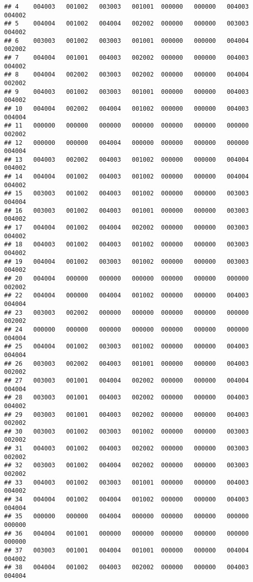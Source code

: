 \documentclass[
]{article}
\begin{document}
\begin{verbatim}
## 4    004003   001002   003003   001001  000000   000000   004003   004002
## 5    004004   001002   004004   002002  000000   000000   003003   004002
## 6    003003   001002   003003   001001  000000   000000   004004   002002
## 7    004004   001001   004003   002002  000000   000000   004003   004002
## 8    004004   002002   003003   002002  000000   000000   004004   002002
## 9    004003   001002   003003   001001  000000   000000   004003   004002
## 10   004004   002002   004004   001002  000000   000000   004003   004004
## 11   000000   000000   000000   000000  000000   000000   000000   002002
## 12   000000   000000   004004   000000  000000   000000   000000   004004
## 13   004003   002002   004003   001002  000000   000000   004004   004002
## 14   004004   001002   004003   001002  000000   000000   004004   004002
## 15   003003   001002   004003   001002  000000   000000   003003   004004
## 16   003003   001002   004003   001001  000000   000000   003003   004002
## 17   004004   001002   004004   002002  000000   000000   003003   004002
## 18   004003   001002   004003   001002  000000   000000   003003   004002
## 19   004004   001002   003003   001002  000000   000000   003003   004002
## 20   004004   000000   000000   000000  000000   000000   000000   002002
## 22   004004   000000   004004   001002  000000   000000   004003   004004
## 23   003003   002002   000000   000000  000000   000000   000000   002002
## 24   000000   000000   000000   000000  000000   000000   000000   004004
## 25   004004   001002   003003   001002  000000   000000   004003   004004
## 26   003003   002002   004003   001001  000000   000000   004003   002002
## 27   003003   001001   004004   002002  000000   000000   004004   004004
## 28   003003   001001   004003   002002  000000   000000   004003   004002
## 29   003003   001001   004003   002002  000000   000000   004003   002002
## 30   003003   001002   003003   001002  000000   000000   003003   002002
## 31   004003   001002   004003   002002  000000   000000   003003   002002
## 32   003003   001002   004004   002002  000000   000000   003003   002002
## 33   004003   001002   003003   001001  000000   000000   004003   004002
## 34   004004   001002   004004   001002  000000   000000   004003   004004
## 35   000000   000000   004004   000000  000000   000000   000000   000000
## 36   004004   001001   000000   000000  000000   000000   000000   000000
## 37   003003   001001   004004   001001  000000   000000   004004   004002
## 38   004004   001002   004003   002002  000000   000000   004003   004004

\end{verbatim}
\end{document}
